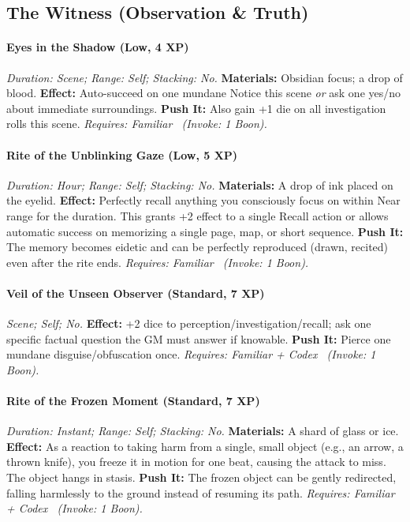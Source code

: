 \documentclass[12pt,twoside]{book}
\begin{document}
\subsection{The Witness (Observation \& Truth)}
\paragraph{Eyes in the Shadow (Low, 4 XP)} \emph{Duration: Scene; Range: Self; Stacking: No.}
\textbf{Materials:} Obsidian focus; a drop of blood.
\textbf{Effect:} Auto-succeed on one mundane Notice this scene \emph{or} ask one yes/no about immediate surroundings.
\textbf{Push It:} Also gain +1 die on all investigation rolls this scene.
\emph{Requires: Familiar \ (\textit{Invoke:} 1 Boon).}
\paragraph{Rite of the Unblinking Gaze (Low, 5 XP)} \emph{Duration: Hour; Range: Self; Stacking: No.}
\textbf{Materials:} A drop of ink placed on the eyelid.
\textbf{Effect:} Perfectly recall anything you consciously focus on within Near range for the duration. This grants +2 effect to a single Recall action or allows automatic success on memorizing a single page, map, or short sequence.
\textbf{Push It:} The memory becomes eidetic and can be perfectly reproduced (drawn, recited) even after the rite ends.
\emph{Requires: Familiar \ (\textit{Invoke:} 1 Boon).}
\paragraph{Veil of the Unseen Observer (Standard, 7 XP)} \emph{Scene; Self; No.}
\textbf{Effect:} +2 dice to perception/investigation/recall; ask one specific factual question the GM must answer if knowable.
\textbf{Push It:} Pierce one mundane disguise/obfuscation once.
\emph{Requires: Familiar + Codex \ (\textit{Invoke:} 1 Boon).}
\paragraph{Rite of the Frozen Moment (Standard, 7 XP)} \emph{Duration: Instant; Range: Self; Stacking: No.}
\textbf{Materials:} A shard of glass or ice.
\textbf{Effect:} As a reaction to taking harm from a single, small object (e.g., an arrow, a thrown knife), you freeze it in motion for one beat, causing the attack to miss. The object hangs in stasis.
\textbf{Push It:} The frozen object can be gently redirected, falling harmlessly to the ground instead of resuming its path.
\emph{Requires: Familiar + Codex \ (\textit{Invoke:} 1 Boon).}
\end{document}
